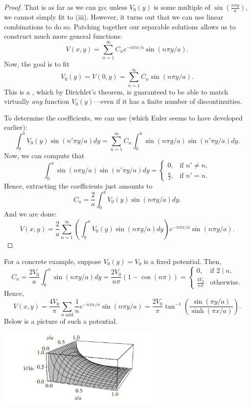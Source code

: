 \begin{proof}
That is as far as we can go; unless $V_0(y)$ is some multiple of $\sin\left(\frac{n\pi y}{a}\right)$, we cannot simply fit to (iii). However, it turns out that we can use linear combinations to do so. Patching together our separable solutions allows us to construct much more general functions:
\[V(x,y)=\sum_{n=1}^\infty C_ne^{-n\pi x/a}\sin(n \pi y/a).\]
Now, the goal is to fit
\[V_0(y)=V(0,y)=\sum_{n=1}^\infty C_n\sin(n\pi y/a).\]
This is a , which by Dirichlet's theorem, is guaranteed to be able to match virtually \textit{any} function $V_0(y)$---even if it has a finite number of discontinuities.

To determine the coefficients, we can use  (which Euler seems to have developed earlier):
\[\int_0^aV_0(y)\sin(n'\pi y/a)dy=\sum_{n=1}^\infty C_n\int_0^a\sin(n\pi y/a)\sin(n'\pi y/a)dy.\]
Now, we can compute that
\[\int_0^a \sin(n\pi y/a)\sin (n'\pi y/a)dy=\begin{cases}
0, & \text{if }n'\neq n,\\
\frac{a}{2}, & \text{if }n'=n.
\end{cases}\]
Hence, extracting the coefficients just amounts to
\[C_n=\frac{2}{a}\int_0^aV_0(y)\sin(n\pi y/a)dy.\]
And we are done:
\[\boxed{V(x,y)=\frac{2}{a}\sum_{n=1}^\infty \left(\int_0^a V_0(y)\sin(n\pi y/a)dy\right)e^{-n\pi x/a}\sin(n\pi y/a)}.\]
\end{proof}

\begin{remark}\label{fixedpot}
For a concrete example, suppose $V_0(y)=V_0$ is a fixed potential. Then,
\[C_n=\frac{2V_0}{a}\int_0^a\sin(n\pi y/a)dy=\frac{2V_0}{n\pi}(1-\cos(n\pi))=\begin{cases}
0, & \text{if }2\mid n,\\
\frac{4V_0}{n\pi} & \text{otherwise}.
\end{cases}\]
Hence, 
\[V(x,y)=\frac{4V_0}{\pi}\sum_{n\text{ odd}}\frac{1}{n}e^{-n\pi x/a}\sin(n\pi y/a)=\frac{2V_0}{\pi}\tan^{-1}\left(\frac{\sin(\pi y/a)}{\sinh (\pi x/a)}\right).\]
Below is a picture of such a potential.
\end{remark}

\begin{center}
    \includegraphics[width=8cm]{Electrodynamics/images/fig3.18.PNG}
\end{center}

